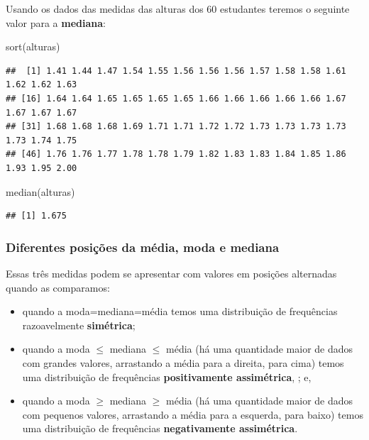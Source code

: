\documentclass[
]{book}
\newenvironment{Shaded}{\begin{snugshade}}{\end{snugshade}}
\newcommand{\FunctionTok}[1]{\textcolor[rgb]{0.00,0.00,0.00}{#1}}
\newcommand{\NormalTok}[1]{#1}
\begin{document}
Usando os dados das medidas das alturas dos 60 estudantes teremos o seguinte valor para a \textbf{mediana}:

\begin{Shaded}
\begin{Highlighting}[]
\FunctionTok{sort}\NormalTok{(alturas)}
\end{Highlighting}
\end{Shaded}

\begin{verbatim}
##  [1] 1.41 1.44 1.47 1.54 1.55 1.56 1.56 1.56 1.57 1.58 1.58 1.61 1.62 1.62 1.63
## [16] 1.64 1.64 1.65 1.65 1.65 1.65 1.66 1.66 1.66 1.66 1.66 1.67 1.67 1.67 1.67
## [31] 1.68 1.68 1.68 1.69 1.71 1.71 1.72 1.72 1.73 1.73 1.73 1.73 1.73 1.74 1.75
## [46] 1.76 1.76 1.77 1.78 1.78 1.79 1.82 1.83 1.83 1.84 1.85 1.86 1.93 1.95 2.00
\end{verbatim}

\begin{Shaded}
\begin{Highlighting}[]
\FunctionTok{median}\NormalTok{(alturas)}
\end{Highlighting}
\end{Shaded}

\begin{verbatim}
## [1] 1.675
\end{verbatim}

\hypertarget{diferentes-posiuxe7uxf5es-da-muxe9dia-moda-e-mediana}{%
\subsubsection{Diferentes posições da média, moda e mediana}\label{diferentes-posiuxe7uxf5es-da-muxe9dia-moda-e-mediana}}

Essas três medidas podem se apresentar com valores em posições alternadas quando as comparamos:

\begin{itemize}
\item
  quando a moda=mediana=média temos uma distribuição de frequências razoavelmente \textbf{simétrica};
\item
  quando a moda \(\leq\) mediana \(\leq\) média (há uma quantidade maior de dados com grandes valores, arrastando a média para a direita, para cima) temos uma distribuição de frequências \textbf{positivamente assimétrica}, ; e,\\
\item
  quando a moda \(\geq\) mediana \(\geq\) média (há uma quantidade maior de dados com pequenos valores, arrastando a média para a esquerda, para baixo) temos uma distribuição de frequências \textbf{negativamente assimétrica}.
\end{itemize}
\end{document}
